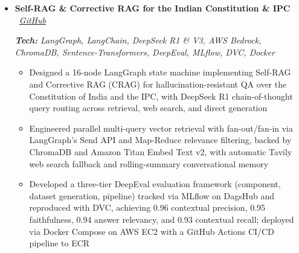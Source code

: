 \documentclass[a4paper,9pt]{extarticle}
\begin{document}
\begin{itemize}[leftmargin=*, itemsep=0.1em]
\vspace{11pt}

\item \textbf{Self-RAG \& Corrective RAG for the Indian Constitution \& IPC} \hfill
\faGithub\ \textit{\href{https://github.com/pankaj-2708/Self-RAG-and-Corrective-RAG-for-Indian-Constitution}{GitHub}}

\textit{\small \textbf{Tech:} LangGraph, LangChain, DeepSeek R1 \& V3, AWS Bedrock, ChromaDB, Sentence-Transformers, DeepEval, MLflow, DVC, Docker}
\begin{itemize}[leftmargin=1.2em, itemsep=0.02em, topsep=1pt]
  \item Designed a 16-node LangGraph state machine implementing Self-RAG and Corrective RAG (CRAG) for hallucination-resistant QA over the Constitution of India and the IPC, with DeepSeek R1 chain-of-thought query routing across retrieval, web search, and direct generation
  \item Engineered parallel multi-query vector retrieval with fan-out/fan-in via LangGraph's Send API and Map-Reduce relevance filtering, backed by ChromaDB and Amazon Titan Embed Text v2, with automatic Tavily web search fallback and rolling-summary conversational memory
  \item Developed a three-tier DeepEval evaluation framework (component, dataset generation, pipeline) tracked via MLflow on DagsHub and reproduced with DVC, achieving 0.96 contextual precision, 0.95 faithfulness, 0.94 answer relevancy, and 0.93 contextual recall; deployed via Docker Compose on AWS EC2 with a GitHub Actions CI/CD pipeline to ECR
\end{itemize}

\end{itemize}
\end{document}
